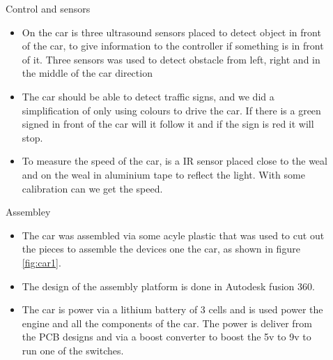 \documentclass[final,hyperref={pdfpagelabels=false}]{beamer}
\begin{document}
\begin{frame}[t]
\begin{columns}[t]
\begin{column}{.465\textwidth}
\end{column} %

\begin{column}{.03\textwidth}\end{column} %
 
\begin{column}{.465\textwidth} %


\begin{block}{Control and sensors}

    \begin{itemize}
        \item On the car is three ultrasound sensors placed to detect object in front of the car, to give information to the controller if something is in front of it. Three sensors was used to detect obstacle from left, right and in the middle of the car direction
        
        \item The car should be able to detect traffic signs, and we did a simplification of only using colours to drive the car. If there is a green signed in front of the car will it follow it and if the sign is red it will stop.  
        
        \item To measure the speed of the car, is a IR sensor placed close to the weal and on the weal in aluminium tape to reflect the light. With some calibration can we get the speed. 
    \end{itemize}
    
    \end{block}



    \begin{block}{Assembley}

        \begin{itemize}
            \item The car was assembled via some acyle plastic that was used to cut out the pieces to assemble the devices one the car, as shown in figure \ref{fig:car1}.
            \item The design of the assembly platform is done in Autodesk fusion 360.
            
            
            \item The car is power via a lithium battery of 3 cells and is used power the engine and all the components of the car. The power is deliver from the PCB designs and via a boost converter to boost the 5v to 9v to run one of the switches.
              

\end{itemize}
\end{block}
\end{column}
\end{columns}
\end{frame}
\end{document}
